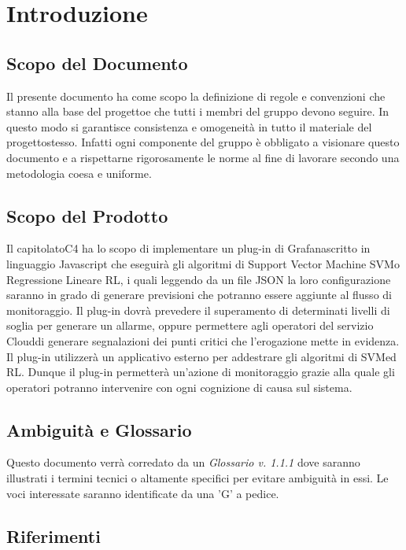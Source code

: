 \section{Introduzione}
\subsection{Scopo del Documento}
Il presente documento ha come scopo la definizione di regole e convenzioni che stanno alla base del progetto\glosp e che tutti i membri del gruppo devono seguire. In questo modo si garantisce consistenza e omogeneità in tutto il materiale del progetto\glosp stesso. Infatti ogni componente del gruppo è obbligato a visionare questo documento e a rispettarne rigorosamente le norme al fine di lavorare secondo una metodologia coesa e uniforme.
\subsection{Scopo del Prodotto}
Il capitolato\glosp C4 ha lo scopo di implementare un plug-in di Grafana\glosp scritto in linguaggio Javascript che eseguirà gli algoritmi di Support Vector Machine SVM\glosp o Regressione Lineare RL\glo, i quali leggendo da un file JSON la loro configurazione saranno in grado di generare previsioni che potranno essere aggiunte al flusso di monitoraggio. Il plug-in dovrà prevedere il superamento di determinati livelli di soglia per generare un allarme, oppure permettere agli operatori del servizio Cloud\glosp di generare segnalazioni dei punti critici che l'erogazione mette in evidenza. Il plug-in utilizzerà un applicativo esterno per addestrare gli algoritmi di SVM\glosp ed RL\glo.
Dunque il plug-in permetterà un'azione di monitoraggio grazie alla quale gli operatori potranno intervenire con ogni cognizione di causa sul sistema.
\subsection{Ambiguità e Glossario}
Questo documento verrà corredato da un \textit{Glossario v. 1.1.1} dove saranno illustrati i termini tecnici o altamente specifici per evitare ambiguità in essi. Le voci interessate saranno identificate da una 'G' a pedice.
\subsection{Riferimenti}
